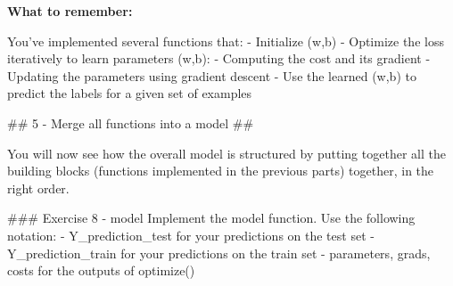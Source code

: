 \documentclass[11pt]{article}
\begin{document}
    \textbf{What to remember:}

You've implemented several functions that: - Initialize (w,b) - Optimize
the loss iteratively to learn parameters (w,b): - Computing the cost and
its gradient - Updating the parameters using gradient descent - Use the
learned (w,b) to predict the labels for a given set of examples

    \#\# 5 - Merge all functions into a model \#\#

You will now see how the overall model is structured by putting together
all the building blocks (functions implemented in the previous parts)
together, in the right order.

\#\#\# Exercise 8 - model Implement the model function. Use the
following notation: - Y\_prediction\_test for your predictions on the
test set - Y\_prediction\_train for your predictions on the train set -
parameters, grads, costs for the outputs of optimize()
\end{document}
